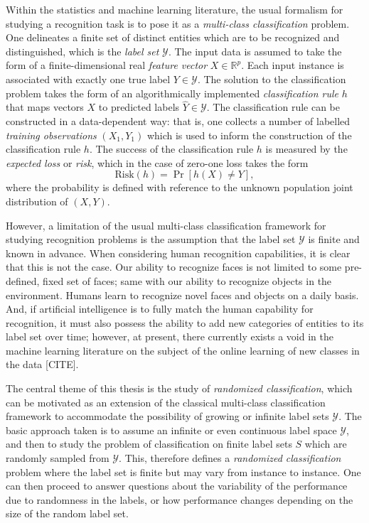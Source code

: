 Within the statistics and machine learning literature, the usual
formalism for studying a recognition task is to pose it as a
\emph{multi-class classification} problem.  One delineates a finite
set of distinct entities which are to be recognized and distinguished,
which is the \emph{label set} $\mathcal{Y}$.  The input data is
assumed to take the form of a finite-dimensional real \emph{feature
  vector} $X \in \mathbb{R}^p$.  Each input instance is associated
with exactly one true label $Y \in \mathcal{Y}$.  The solution to the
classification problem takes the form of an algorithmically
implemented \emph{classification rule} $h$ that maps vectors $X$ to
predicted labels $\hat{Y} \in \mathcal{Y}$.  The classification rule
can be constructed in a data-dependent way: that is, one collects a
number of labelled \emph{training observations} $(X_1, Y_1)$ which is
used to inform the construction of the classification rule $h$.  The
success of the classification rule $h$ is measured by the \emph{expected loss} or \emph{risk},
which in the case of zero-one loss takes the form
\[
\text{Risk}(h) = \Pr[h(X) \neq Y],
\]
where the probability is defined with reference to the unknown
population joint distribution of $(X, Y)$.  

However, a limitation of the usual multi-class classification
framework for studying recognition problems is the assumption that the
label set $\mathcal{Y}$ is finite and known in advance.  When
considering human recognition capabilities, it is clear that this is
not the case.  Our ability to recognize faces is not limited to some
pre-defined, fixed set of faces; same with our ability to recognize
objects in the environment.  Humans learn to recognize novel faces and
objects on a daily basis.  And, if artificial intelligence is to fully
match the human capability for recognition, it must also possess the
ability to add new categories of entities to its label set over time;
however, at present, there currently exists a void in the machine
learning literature on the subject of the online learning of new
classes in the data [CITE].

The central theme of this thesis is the study of \emph{randomized
  classification}, which can be motivated as an extension of the
classical multi-class classification framework to accommodate the
possibility of growing or infinite label sets $\mathcal{Y}$. The basic
approach taken is to assume an infinite or even continuous label space
$\mathcal{Y}$, and then to study the problem of classification on
finite label sets $S$ which are randomly sampled from $\mathcal{Y}.$
This, therefore defines a \emph{randomized classification} problem
where the label set is finite but may vary from instance to instance.
One can then proceed to answer questions about the variability of the
performance due to randomness in the labels, or how performance
changes depending on the size of the random label set.

